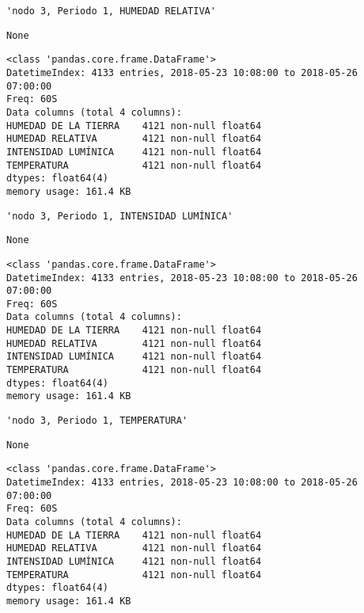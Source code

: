 \documentclass[11pt]{article}
\begin{document}
    
    \begin{verbatim}
'nodo 3, Periodo 1, HUMEDAD RELATIVA'
    \end{verbatim}

    
    
    \begin{verbatim}
None
    \end{verbatim}

    
    \begin{Verbatim}[commandchars=\\\{\}]
<class 'pandas.core.frame.DataFrame'>
DatetimeIndex: 4133 entries, 2018-05-23 10:08:00 to 2018-05-26 07:00:00
Freq: 60S
Data columns (total 4 columns):
HUMEDAD DE LA TIERRA    4121 non-null float64
HUMEDAD RELATIVA        4121 non-null float64
INTENSIDAD LUMÍNICA     4121 non-null float64
TEMPERATURA             4121 non-null float64
dtypes: float64(4)
memory usage: 161.4 KB

    \end{Verbatim}

    
    \begin{verbatim}
'nodo 3, Periodo 1, INTENSIDAD LUMÍNICA'
    \end{verbatim}

    
    
    \begin{verbatim}
None
    \end{verbatim}

    
    \begin{Verbatim}[commandchars=\\\{\}]
<class 'pandas.core.frame.DataFrame'>
DatetimeIndex: 4133 entries, 2018-05-23 10:08:00 to 2018-05-26 07:00:00
Freq: 60S
Data columns (total 4 columns):
HUMEDAD DE LA TIERRA    4121 non-null float64
HUMEDAD RELATIVA        4121 non-null float64
INTENSIDAD LUMÍNICA     4121 non-null float64
TEMPERATURA             4121 non-null float64
dtypes: float64(4)
memory usage: 161.4 KB

    \end{Verbatim}

    
    \begin{verbatim}
'nodo 3, Periodo 1, TEMPERATURA'
    \end{verbatim}

    
    
    \begin{verbatim}
None
    \end{verbatim}

    
    \begin{Verbatim}[commandchars=\\\{\}]
<class 'pandas.core.frame.DataFrame'>
DatetimeIndex: 4133 entries, 2018-05-23 10:08:00 to 2018-05-26 07:00:00
Freq: 60S
Data columns (total 4 columns):
HUMEDAD DE LA TIERRA    4121 non-null float64
HUMEDAD RELATIVA        4121 non-null float64
INTENSIDAD LUMÍNICA     4121 non-null float64
TEMPERATURA             4121 non-null float64
dtypes: float64(4)
memory usage: 161.4 KB

    \end{Verbatim}
\end{document}
